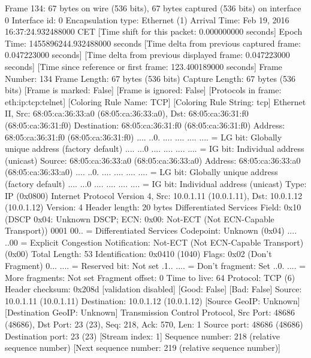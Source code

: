 Frame 134: 67 bytes on wire (536 bits), 67 bytes captured (536 bits) on interface 0
    Interface id: 0
    Encapsulation type: Ethernet (1)
    Arrival Time: Feb 19, 2016 16:37:24.932488000 CET
    [Time shift for this packet: 0.000000000 seconds]
    Epoch Time: 1455896244.932488000 seconds
    [Time delta from previous captured frame: 0.047223000 seconds]
    [Time delta from previous displayed frame: 0.047223000 seconds]
    [Time since reference or first frame: 123.400189000 seconds]
    Frame Number: 134
    Frame Length: 67 bytes (536 bits)
    Capture Length: 67 bytes (536 bits)
    [Frame is marked: False]
    [Frame is ignored: False]
    [Protocols in frame: eth:ip:tcp:telnet]
    [Coloring Rule Name: TCP]
    [Coloring Rule String: tcp]
Ethernet II, Src: 68:05:ca:36:33:a0 (68:05:ca:36:33:a0), Dst: 68:05:ca:36:31:f0 (68:05:ca:36:31:f0)
    Destination: 68:05:ca:36:31:f0 (68:05:ca:36:31:f0)
        Address: 68:05:ca:36:31:f0 (68:05:ca:36:31:f0)
        .... ..0. .... .... .... .... = LG bit: Globally unique address (factory default)
        .... ...0 .... .... .... .... = IG bit: Individual address (unicast)
    Source: 68:05:ca:36:33:a0 (68:05:ca:36:33:a0)
        Address: 68:05:ca:36:33:a0 (68:05:ca:36:33:a0)
        .... ..0. .... .... .... .... = LG bit: Globally unique address (factory default)
        .... ...0 .... .... .... .... = IG bit: Individual address (unicast)
    Type: IP (0x0800)
Internet Protocol Version 4, Src: 10.0.1.11 (10.0.1.11), Dst: 10.0.1.12 (10.0.1.12)
    Version: 4
    Header length: 20 bytes
    Differentiated Services Field: 0x10 (DSCP 0x04: Unknown DSCP; ECN: 0x00: Not-ECT (Not ECN-Capable Transport))
        0001 00.. = Differentiated Services Codepoint: Unknown (0x04)
        .... ..00 = Explicit Congestion Notification: Not-ECT (Not ECN-Capable Transport) (0x00)
    Total Length: 53
    Identification: 0x0410 (1040)
    Flags: 0x02 (Don't Fragment)
        0... .... = Reserved bit: Not set
        .1.. .... = Don't fragment: Set
        ..0. .... = More fragments: Not set
    Fragment offset: 0
    Time to live: 64
    Protocol: TCP (6)
    Header checksum: 0x208d [validation disabled]
        [Good: False]
        [Bad: False]
    Source: 10.0.1.11 (10.0.1.11)
    Destination: 10.0.1.12 (10.0.1.12)
    [Source GeoIP: Unknown]
    [Destination GeoIP: Unknown]
Transmission Control Protocol, Src Port: 48686 (48686), Dst Port: 23 (23), Seq: 218, Ack: 570, Len: 1
    Source port: 48686 (48686)
    Destination port: 23 (23)
    [Stream index: 1]
    Sequence number: 218    (relative sequence number)
    [Next sequence number: 219    (relative sequence number)]
